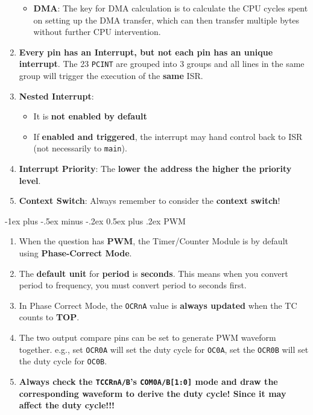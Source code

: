 \documentclass[10pt, landscape]{article}
\makeatletter
\renewcommand{\section}{\@startsection{section}{1}{0mm}%
                                {-1ex plus -.5ex minus -.2ex}%
                                {0.5ex plus .2ex}%
                                {\normalfont\large\bfseries}}
\makeatother
\begin{document}
\begin{multicols}{4}
\begin{enumerate}
\begin{itemize}
        \item \textbf{DMA}: The key for DMA calculation is to calculate the CPU cycles spent on setting up the DMA transfer, which can then transfer multiple bytes without further CPU intervention.
    \end{itemize}
    \item \textbf{Every pin has an Interrupt, but not each pin has an unique interrupt}. The 23 \texttt{PCINT} are grouped into 3 groups and all lines in the same group will trigger the execution of the \textbf{same} ISR.
    \item \textbf{Nested Interrupt}:
    \begin{itemize}
        \item It is \textbf{not enabled by default}
        \item If \textbf{enabled and triggered}, the interrupt may hand control back to ISR (not necessarily to \texttt{main}). 
    \end{itemize}
    \item \textbf{Interrupt Priority}: The \textbf{lower the address the higher the priority level}.
    \item \textbf{Context Switch}: Always remember to consider the \textbf{context switch}!
    
\end{enumerate}

\section{PWM}
\begin{enumerate}
    \item When the question has \textbf{PWM}, the Timer/Counter Module is by default using \textbf{Phase-Correct Mode}.
    \item The \textbf{default unit} for \textbf{period} is \textbf{seconds}. This means when you convert period to frequency, you must convert period to seconds first.
    \item In Phase Correct Mode, the \texttt{OCRnA} value is \textbf{always updated} when the TC counts to \textbf{TOP}.
    \item The two output compare pins can be set to generate PWM waveform together. e.g., set \texttt{OCR0A} will set the duty cycle for \texttt{OC0A}, set the \texttt{OCR0B} will set the duty cycle for \texttt{OC0B}.
    \item \textbf{Always check the \texttt{TCCRnA/B}'s \texttt{COM0A/B[1:0]} mode and draw the corresponding waveform to derive the duty cycle! Since it may affect the duty cycle!!!}
\end{enumerate}


\end{multicols}
\end{document}
